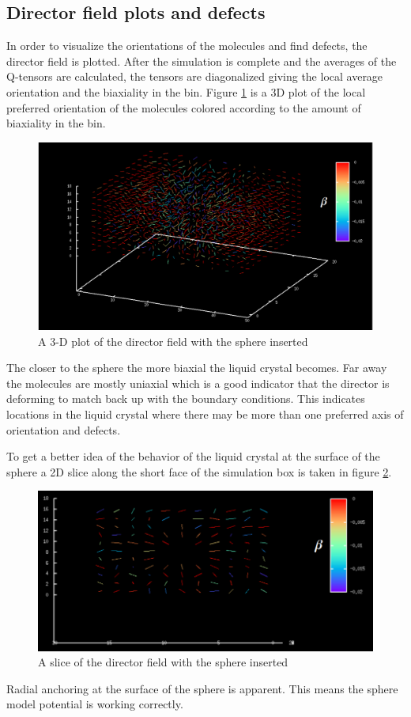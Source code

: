 \documentclass[preprint, aps]{revtex4-1}
\begin{document}
\subsection*{Director field plots and defects}
In order to visualize the orientations of the molecules and find defects, the 
director field is plotted. After the simulation is complete and the averages of
the Q-tensors are calculated, the tensors are diagonalized giving the local
average orientation and the biaxiality in the bin. Figure \ref{fig:biaxial-3d}
is a 3D plot of the local preferred orientation of the molecules colored
according to the amount of biaxiality in the bin. 
	\begin{figure}[H]
		\includegraphics[width=\textwidth]{biaxial-3d.png}
		\caption{A 3-D plot of the director field with the sphere inserted}
		\label{fig:biaxial-3d}
	\end{figure}
The closer to the sphere the more biaxial the liquid crystal becomes. Far away
the molecules are mostly uniaxial which is a good indicator that the director is
deforming to match back up with the boundary conditions. This indicates
locations in the liquid crystal where there may be more than one preferred axis 
of orientation and defects.

To get a better idea of the behavior of the liquid crystal at the surface of the
sphere a 2D slice along the short face of the simulation box is taken in figure
\ref{fig:biaxial-2d}.
	\begin{figure}[H]
		\includegraphics[width=\textwidth]{biaxial-2d.png}
		\caption{A slice of the director field with the sphere inserted}
		\label{fig:biaxial-2d}
	\end{figure}
Radial anchoring at the surface of the sphere is apparent. This means the sphere
model potential is working correctly.
\end{document}
